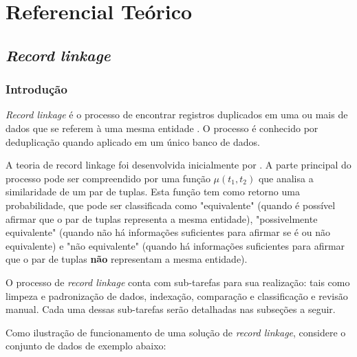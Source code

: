 \documentclass[
	12pt,				%
	openany,			%
	twoside,			%
	a4paper,			%
	brazil,				%
	]{unimontes-ppgmsc-abntex2}
\begin{document}
\chapter{Referencial Teórico}
\section{\textit{Record linkage}}
\subsection{Introdução}

\textit{Record linkage} é o processo de encontrar registros duplicados em uma ou mais de dados que se referem à uma mesma entidade \cite{survey}. O processo é conhecido por deduplicação quando aplicado em um único banco de dados.

A teoria de record linkage foi desenvolvida inicialmente por \cite{fellegi}. A parte principal do processo pode ser compreendido por uma função $\mu(t_1,t_2)$ que analisa a similaridade de um par de tuplas. Esta função tem como retorno uma probabilidade, que pode ser classificada como "equivalente" (quando é possível afirmar que o par de tuplas representa a mesma entidade), "possivelmente equivalente" (quando não há informações suficientes para afirmar se é ou não equivalente) e "não equivalente" (quando há informações suficientes para afirmar que o par de tuplas \textbf{não} representam a mesma entidade).

O processo de \textit{record linkage} conta com sub-tarefas para sua realização: tais como limpeza e padronização de dados, indexação, comparação e classificação e revisão manual. Cada uma dessas sub-tarefas serão detalhadas nas subseções a seguir.

Como ilustração de funcionamento de uma solução de \textit{record linkage}, considere o conjunto de dados de exemplo abaixo:
\end{document}
